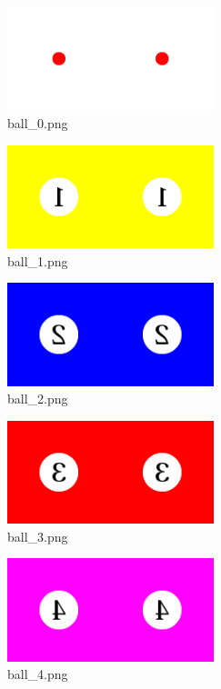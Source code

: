 \documentclass[a4j,titlepage]{jsarticle}
\begin{document}
\begin{figure}[H]
  \centering
  \includegraphics[width=6cm]{../images/ball_0.png}
  \caption{ball\_0.png}
  \label{fig:ball_0}
\end{figure}

\begin{figure}[H]
  \centering
  \includegraphics[width=6cm]{../images/ball_1.png}
  \caption{ball\_1.png}
  \label{fig:ball_1}
\end{figure}

\begin{figure}[H]
  \centering
  \includegraphics[width=6cm]{../images/ball_2.png}
  \caption{ball\_2.png}
  \label{fig:ball_2}
\end{figure}

\begin{figure}[H]
  \centering
  \includegraphics[width=6cm]{../images/ball_3.png}
  \caption{ball\_3.png}
  \label{fig:ball_3}
\end{figure}

\begin{figure}[H]
  \centering
  \includegraphics[width=6cm]{../images/ball_4.png}
  \caption{ball\_4.png}
  \label{fig:ball_4}
\end{figure}
\end{document}
